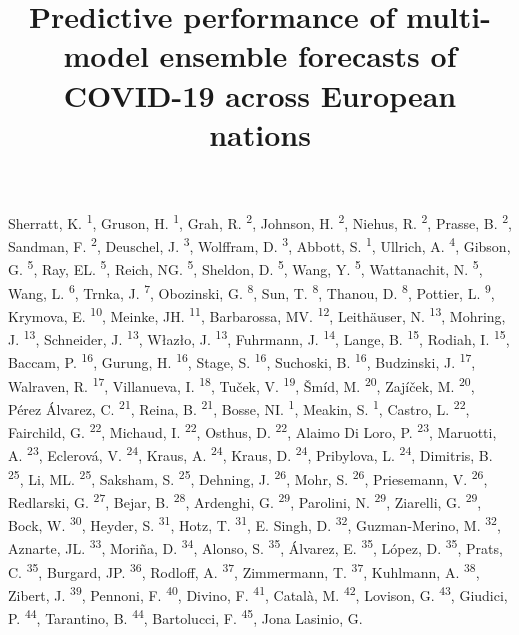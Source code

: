 \documentclass[
]{article}
\title{Predictive performance of multi-model ensemble forecasts of COVID-19 across European nations}
\author{}
\date{\vspace{-2.5em}}
\begin{document}
\maketitle

Sherratt, K. \textsuperscript{1}, Gruson, H. \textsuperscript{1}, Grah, R. \textsuperscript{2}, Johnson, H. \textsuperscript{2}, Niehus, R. \textsuperscript{2}, Prasse, B. \textsuperscript{2}, Sandman, F. \textsuperscript{2}, Deuschel, J. \textsuperscript{3}, Wolffram, D. \textsuperscript{3}, Abbott, S. \textsuperscript{1}, Ullrich, A. \textsuperscript{4}, Gibson, G. \textsuperscript{5}, Ray, EL. \textsuperscript{5}, Reich, NG. \textsuperscript{5}, Sheldon, D. \textsuperscript{5}, Wang, Y. \textsuperscript{5}, Wattanachit, N. \textsuperscript{5}, Wang, L. \textsuperscript{6}, Trnka, J. \textsuperscript{7}, Obozinski, G. \textsuperscript{8}, Sun, T. \textsuperscript{8}, Thanou, D. \textsuperscript{8}, Pottier, L. \textsuperscript{9}, Krymova, E. \textsuperscript{10}, Meinke, JH. \textsuperscript{11}, Barbarossa, MV. \textsuperscript{12}, Leithäuser, N. \textsuperscript{13}, Mohring, J. \textsuperscript{13}, Schneider, J. \textsuperscript{13}, Włazło, J. \textsuperscript{13}, Fuhrmann, J. \textsuperscript{14}, Lange, B. \textsuperscript{15}, Rodiah, I. \textsuperscript{15}, Baccam, P. \textsuperscript{16}, Gurung, H. \textsuperscript{16}, Stage, S. \textsuperscript{16}, Suchoski, B. \textsuperscript{16}, Budzinski, J. \textsuperscript{17}, Walraven, R. \textsuperscript{17}, Villanueva, I. \textsuperscript{18}, Tuček, V. \textsuperscript{19}, Šmíd, M. \textsuperscript{20}, Zajíček, M. \textsuperscript{20}, Pérez Álvarez, C. \textsuperscript{21}, Reina, B. \textsuperscript{21}, Bosse, NI. \textsuperscript{1}, Meakin, S. \textsuperscript{1}, Castro, L. \textsuperscript{22}, Fairchild, G. \textsuperscript{22}, Michaud, I. \textsuperscript{22}, Osthus, D. \textsuperscript{22}, Alaimo Di Loro, P. \textsuperscript{23}, Maruotti, A. \textsuperscript{23}, Eclerová, V. \textsuperscript{24}, Kraus, A. \textsuperscript{24}, Kraus, D. \textsuperscript{24}, Pribylova, L. \textsuperscript{24}, Dimitris, B. \textsuperscript{25}, Li, ML. \textsuperscript{25}, Saksham, S. \textsuperscript{25}, Dehning, J. \textsuperscript{26}, Mohr, S. \textsuperscript{26}, Priesemann, V. \textsuperscript{26}, Redlarski, G. \textsuperscript{27}, Bejar, B. \textsuperscript{28}, Ardenghi, G. \textsuperscript{29}, Parolini, N. \textsuperscript{29}, Ziarelli, G. \textsuperscript{29}, Bock, W. \textsuperscript{30}, Heyder, S. \textsuperscript{31}, Hotz, T. \textsuperscript{31}, E. Singh, D. \textsuperscript{32}, Guzman-Merino, M. \textsuperscript{32}, Aznarte, JL. \textsuperscript{33}, Moriña, D. \textsuperscript{34}, Alonso, S. \textsuperscript{35}, Álvarez, E. \textsuperscript{35}, López, D. \textsuperscript{35}, Prats, C. \textsuperscript{35}, Burgard, JP. \textsuperscript{36}, Rodloff, A. \textsuperscript{37}, Zimmermann, T. \textsuperscript{37}, Kuhlmann, A. \textsuperscript{38}, Zibert, J. \textsuperscript{39}, Pennoni, F. \textsuperscript{40}, Divino, F. \textsuperscript{41}, Català, M. \textsuperscript{42}, Lovison, G. \textsuperscript{43}, Giudici, P. \textsuperscript{44}, Tarantino, B. \textsuperscript{44}, Bartolucci, F. \textsuperscript{45}, Jona Lasinio, G. 
\end{document}
